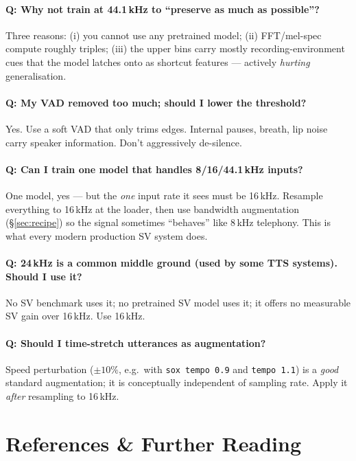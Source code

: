 \documentclass[11pt,a4paper]{article}
\begin{document}
\paragraph{Q: Why not train at 44.1\,kHz to ``preserve as much as possible''?}
Three reasons: (i) you cannot use any pretrained model; (ii) FFT/mel-spec compute roughly triples;
(iii) the upper bins carry mostly recording-environment cues that the model latches onto as shortcut
features --- actively \emph{hurting} generalisation.

\paragraph{Q: My VAD removed too much; should I lower the threshold?}
Yes. Use a soft VAD that only trims edges. Internal pauses, breath, lip noise carry speaker
information. Don't aggressively de-silence.

\paragraph{Q: Can I train one model that handles 8/16/44.1\,kHz inputs?}
One model, yes --- but the \emph{one} input rate it sees must be 16\,kHz. Resample everything to
16\,kHz at the loader, then use bandwidth augmentation (\S\ref{sec:recipe}) so the signal sometimes
``behaves'' like 8\,kHz telephony. This is what every modern production SV system does.

\paragraph{Q: 24\,kHz is a common middle ground (used by some TTS systems). Should I use it?}
No SV benchmark uses it; no pretrained SV model uses it; it offers no measurable SV gain over
16\,kHz. Use 16\,kHz.

\paragraph{Q: Should I time-stretch utterances as augmentation?}
Speed perturbation ($\pm10\%$, e.g.\ with \texttt{sox tempo 0.9} and \texttt{tempo 1.1}) is a
\emph{good} standard augmentation; it is conceptually independent of sampling rate. Apply it
\emph{after} resampling to 16\,kHz.

\section{References \& Further Reading}
\label{sec:refs}
\end{document}
